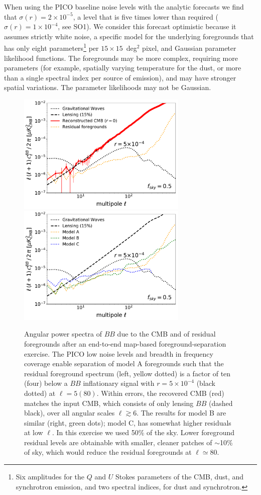 \documentclass[PICOReport.tex]{subfiles}
\begin{document}
When using the PICO baseline noise levels with the analytic forecasts we find that $\sigma(r) = 2\times 10^{-5}$, a level that is five times lower than required ($\sigma(r) =1 \times 10^{-4}$, see SO1). We consider this forecast optimistic because it assumes strictly white noise, a specific model for the underlying foregrounds that has only eight parameters\footnote{Six amplitudes for the $Q$ and $U$ Stokes parameters of the CMB, dust, and synchrotron emission, and two spectral indices, for dust and synchrotron.} per $15 \times 15$~deg$^{2}$ pixel, and Gaussian parameter likelihood functions. The foregrounds may be more complex, requiring more  parameters (for example, spatially varying temperature for the dust, or more than a single spectral index per source of emission), and may have stronger spatial variations. The parameter likelihoods may not be Gaussian. 
\begin{figure}[h]
\includegraphics[width=3.2in]{images/gnilc_9092_residual.pdf}
\hspace{0.1in}
\includegraphics[width=3.2in]{images/gnilc_several_residuals.pdf}
\vspace{-0.3in}
\caption{\captiontext Angular power spectra of $BB$ due to the CMB and of residual foregrounds after an end-to-end map-based foreground-separation exercise. The PICO low noise levels and breadth in frequency coverage enable separation of model A foregrounds such that the residual foreground spectrum (left, yellow dotted) is a factor of ten (four) below a $BB$ inflationary signal with $r=5\times10^{-4}$ (black dotted) at $\ell=5 (80)$. Within errors, the recovered CMB (red) matches the input CMB, which consists of only lensing $BB$ (dashed black), over all angular scales $\ell \gtrsim 6$.  The results for model B are similar (right, green dots); model C, has somewhat higher residuals at low $\ell$. In this exercise we used 50\% of the sky. Lower foreground residual levels are obtainable with smaller, cleaner patches of $\sim$10\% of sky, which would reduce the residual foregrounds at $\ell \simeq 80$. 
\label{fig:nilc} } 
\vspace{-0.05in}
\end{figure}
\end{document}
